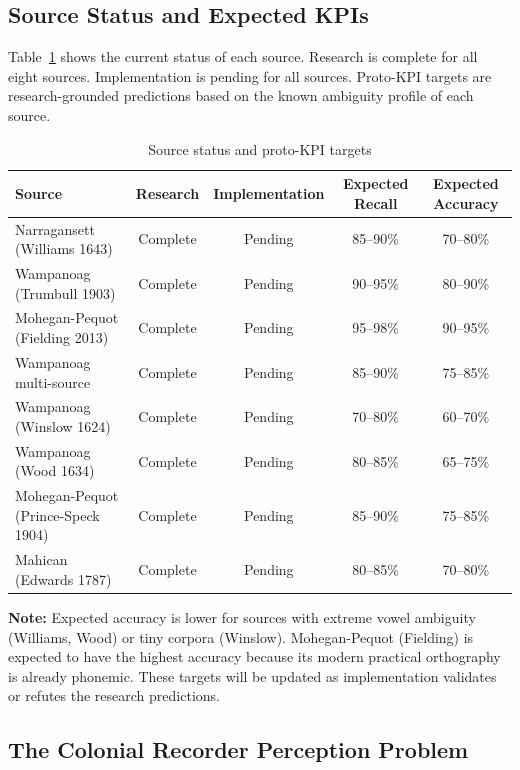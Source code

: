 \subsection{Source Status and Expected KPIs}
\label{sec:status}

Table~\ref{tab:status} shows the current status of each source. Research is
complete for all eight sources. Implementation is pending for all sources.
Proto-KPI targets are research-grounded predictions based on the known
ambiguity profile of each source.

\begin{table}[ht]
\centering
\caption{Source status and proto-KPI targets}
\label{tab:status}
\small
\begin{tabular}{lcccc}
\toprule
\textbf{Source} & \textbf{Research} & \textbf{Implementation} &
\textbf{Expected Recall} & \textbf{Expected Accuracy} \\
\midrule
Narragansett (Williams 1643) & Complete & Pending & 85--90\% & 70--80\% \\
Wampanoag (Trumbull 1903) & Complete & Pending & 90--95\% & 80--90\% \\
Mohegan-Pequot (Fielding 2013) & Complete & Pending & 95--98\% & 90--95\% \\
Wampanoag multi-source & Complete & Pending & 85--90\% & 75--85\% \\
Wampanoag (Winslow 1624) & Complete & Pending & 70--80\% & 60--70\% \\
Wampanoag (Wood 1634) & Complete & Pending & 80--85\% & 65--75\% \\
Mohegan-Pequot (Prince-Speck 1904) & Complete & Pending & 85--90\% & 75--85\% \\
Mahican (Edwards 1787) & Complete & Pending & 80--85\% & 70--80\% \\
\bottomrule
\end{tabular}
\end{table}

\noindent\textbf{Note:} Expected accuracy is lower for sources with extreme
vowel ambiguity (Williams, Wood) or tiny corpora (Winslow). Mohegan-Pequot
(Fielding) is expected to have the highest accuracy because its modern
practical orthography is already phonemic. These targets will be updated as
implementation validates or refutes the research predictions.

\subsection{The Colonial Recorder Perception Problem}
\label{sec:related-work}

